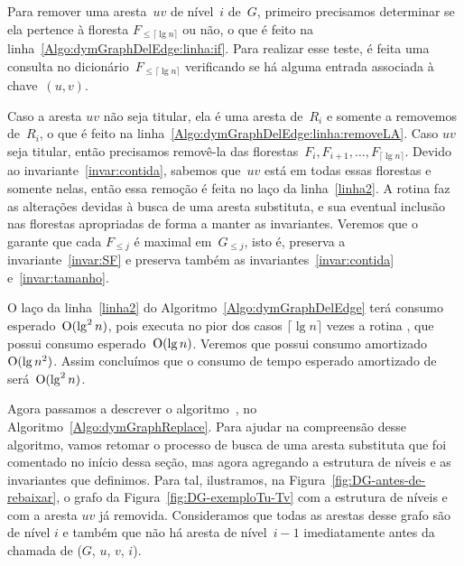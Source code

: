 Para remover uma aresta~$uv$ de nível~$i$ de~$G$, primeiro precisamos determinar se ela pertence à floresta $F_{\leqslant\lceil \lg n \rceil}$ ou não, o que é feito na linha~\ref{Algo:dymGraphDelEdge:linha:if}.
Para realizar esse teste, é feita uma consulta no dicionário~$F_{\leqslant\lceil \lg n \rceil}$ verificando se há alguma entrada associada à chave~$(u,v)$.

Caso a aresta $uv$ não seja titular, ela é uma aresta de~$R_i$ e somente a removemos de~$R_i$, o que é feito na linha~\ref{Algo:dymGraphDelEdge:linha:removeLA}.
Caso $uv$ seja titular, então precisamos removê-la das florestas~$F_i, F_{i+1}, \ldots, F_{\lceil \lg n \rceil}$.  Devido ao invariante~\ref{invar:contida}, sabemos que~$uv$ está em todas essas florestas e somente nelas, então essa remoção é feita no laço da linha~\ref{linha2}.  
A rotina \dymGraphReplace{} faz as alterações devidas à busca de uma aresta substituta, e sua eventual inclusão nas florestas apropriadas de forma a manter as invariantes.
Veremos que o \dymGraphReplace{} garante que cada $F_{\leqslant j}$ é maximal em~$G_{\leqslant j}$, isto é, preserva a invariante~\ref{invar:SF} e preserva também as invariantes~\ref{invar:contida} e~\ref{invar:tamanho}.


O laço da linha~\ref{linha2} do Algoritmo~\ref{Algo:dymGraphDelEdge} terá consumo esperado~$\mathrm{O}(\lg^2 n)$, pois executa no pior dos casos $\lceil \lg n \rceil$ vezes a rotina \dymForestDelEdge{}, que possui consumo esperado~$\mathrm{O}(\lg n)$.
Veremos que \dymGraphReplace{} possui consumo amortizado~$\mathrm{O}(\lg n^2)$. Assim concluímos que o consumo de tempo esperado amortizado de \dymGraphDelEdge{} será~$\mathrm{O}(\lg^2 n)$.

Agora passamos a descrever o algoritmo~\dymGraphReplace{},  no Algoritmo~\ref{Algo:dymGraphReplace}. Para ajudar na compreensão desse algoritmo, vamos retomar o processo de busca de uma aresta substituta que foi comentado no início dessa seção, mas agora agregando a estrutura de níveis e as invariantes que definimos. Para tal, ilustramos, na Figura~\ref{fig:DG-antes-de-rebaixar}, o grafo da Figura~\ref{fig:DG-exemploTu-Tv} com a estrutura de níveis e com a aresta $uv$ já removida. Consideramos que todas as arestas desse grafo são de nível $i$ e também que não há aresta de nível~$i-1$ imediatamente antes da chamada de \dymGraphReplace($G$, $u$, $v$, $i$).

